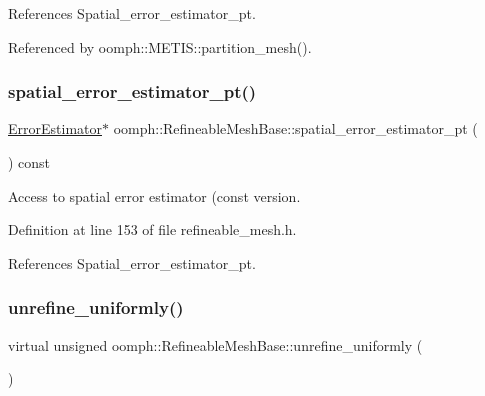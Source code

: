 References Spatial\+\_\+error\+\_\+estimator\+\_\+pt.



Referenced by oomph\+::\+M\+E\+T\+I\+S\+::partition\+\_\+mesh().

\mbox{\label{classoomph_1_1RefineableMeshBase_a3acbda3faa159eaa9a2889af8a432175}} 
\subsubsection{\texorpdfstring{spatial\+\_\+error\+\_\+estimator\+\_\+pt()}{spatial\_error\_estimator\_pt()}\hspace{0.1cm}{\footnotesize\ttfamily [2/2]}}
{\footnotesize\ttfamily \hyperlink{classoomph_1_1ErrorEstimator}{Error\+Estimator}$\ast$ oomph\+::\+Refineable\+Mesh\+Base\+::spatial\+\_\+error\+\_\+estimator\+\_\+pt (\begin{DoxyParamCaption}{ }\end{DoxyParamCaption}) const\hspace{0.3cm}{\ttfamily [inline]}}



Access to spatial error estimator (const version. 



Definition at line 153 of file refineable\+\_\+mesh.\+h.



References Spatial\+\_\+error\+\_\+estimator\+\_\+pt.

\mbox{\label{classoomph_1_1RefineableMeshBase_a5bbd5c85e7c5c9e75c5a28155ac3f956}} 
\subsubsection{\texorpdfstring{unrefine\+\_\+uniformly()}{unrefine\_uniformly()}}
{\footnotesize\ttfamily virtual unsigned oomph\+::\+Refineable\+Mesh\+Base\+::unrefine\+\_\+uniformly (\begin{DoxyParamCaption}{ }\end{DoxyParamCaption})\hspace{0.3cm}{\ttfamily [pure virtual]}}




